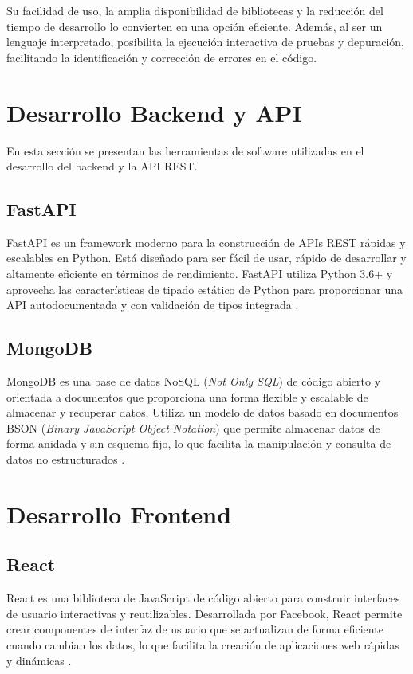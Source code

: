 Su facilidad de uso, la amplia disponibilidad de bibliotecas y la reducción del
tiempo de desarrollo lo convierten en una opción eficiente. Además, al ser un
lenguaje interpretado, posibilita la ejecución interactiva de pruebas y
depuración, facilitando la identificación y corrección de errores en el código.

\section{Desarrollo Backend y API}

En esta sección se presentan las herramientas de software utilizadas en el
desarrollo del backend y la API REST.

\subsection{FastAPI}

FastAPI es un framework moderno para la construcción de APIs REST rápidas y
escalables en Python. Está diseñado para ser fácil de usar, rápido de
desarrollar y altamente eficiente en términos de rendimiento. FastAPI utiliza
Python 3.6+ y aprovecha las características de tipado estático de Python para
proporcionar una API autodocumentada y con validación de tipos integrada
\cite{FastAPI}.

\subsection{MongoDB}

MongoDB es una base de datos NoSQL (\textit{Not Only SQL}) de código abierto y
orientada a documentos que proporciona una forma flexible y escalable de
almacenar y recuperar datos. Utiliza un modelo de datos basado en documentos
BSON (\textit{Binary JavaScript Object Notation}) que permite almacenar datos
de forma anidada y sin esquema fijo, lo que facilita la manipulación y consulta
de datos no estructurados \cite{MongoDB}.

\section{Desarrollo Frontend}

\subsection{React}

React es una biblioteca de JavaScript de código abierto para construir
interfaces de usuario interactivas y reutilizables. Desarrollada por Facebook,
React permite crear componentes de interfaz de usuario que se actualizan de
forma eficiente cuando cambian los datos, lo que facilita la creación de
aplicaciones web rápidas y dinámicas \cite{React}.

